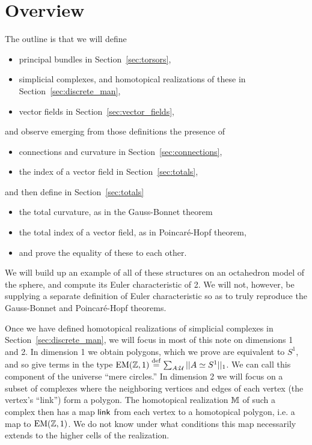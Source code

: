 \section{Overview}

The outline is that we will define 
\begin{itemize}
\item principal bundles in Section~\ref{sec:torsors},
\item simplicial complexes, and homotopical realizations of these in Section~\ref{sec:discrete_man},
\item vector fields in Section~\ref{sec:vector_fields},
\end{itemize}
and observe emerging from those definitions the presence of
\begin{itemize}
\item connections and curvature in Section~\ref{sec:connections},
\item the index of a vector field in Section~\ref{sec:totals},
\end{itemize}
and then define in Section~\ref{sec:totals}
\begin{itemize}
\item the total curvature, as in the Gauss-Bonnet theorem
\item the total index of a vector field, as in Poincaré-Hopf theorem,
\item and prove the equality of these to each other.
\end{itemize}


We will build up an example of all of these structures on an octahedron model of the sphere, and compute its Euler characteristic of 2. We will not, however, be supplying a separate definition of Euler characteristic so as to truly reproduce the Gauss-Bonnet and Poincaré-Hopf theorems.

Once we have defined homotopical realizations of simplicial complexes in Section~\ref{sec:discrete_man}, we will focus in most of this note on dimensions 1 and 2. In dimension 1 we obtain polygons, which we prove are equivalent to \( S^1 \), and so give terms in the type \( \mathrm{EM}(\mathbb{Z},1)\stackrel{\mathrm{def}}{=} \sum_{A:\mathcal{U}}||A\simeq S^1||_1 \). We can call this component of the universe ``mere circles.'' In dimension 2 we will focus on a subset of complexes where the neighboring vertices and edges of each vertex (the vertex's ``link'') form a polygon. The homotopical realization \( \mathbb{M} \) of such a complex then has a map \( \operatorname{\mathsf{link}} \) from each vertex to a homotopical polygon, i.e. a map to \( \mathrm{EM}(\mathbb{Z},1) \). We do not know under what conditions this map necessarily extends to the higher cells of the realization.

